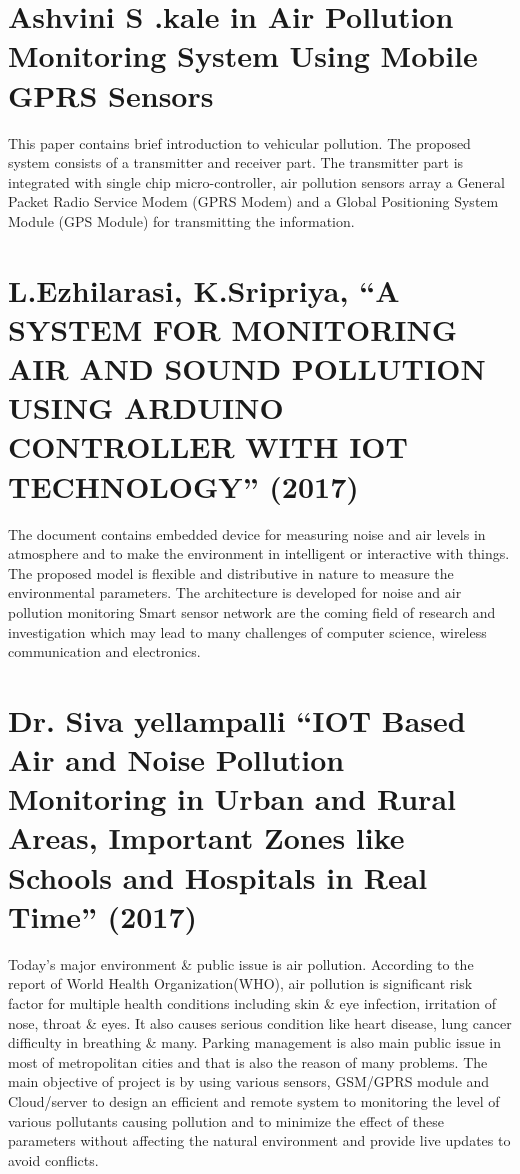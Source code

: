 \section{Ashvini S .kale in Air Pollution Monitoring System Using Mobile GPRS Sensors}
This paper contains brief introduction to vehicular pollution. The proposed system consists of a transmitter and receiver part. The transmitter part is integrated with single chip micro-controller, air pollution sensors array a General Packet Radio Service Modem (GPRS Modem) and a Global Positioning System Module (GPS Module) for transmitting the information.

\section{L.Ezhilarasi, K.Sripriya, “A SYSTEM FOR MONITORING AIR AND SOUND
POLLUTION USING ARDUINO CONTROLLER WITH IOT TECHNOLOGY”
(2017)}

The document contains embedded device for measuring noise and air levels in atmosphere and to make the environment in intelligent or interactive with things. The proposed model is flexible and distributive in nature to measure the environmental parameters. The architecture is developed for noise and air pollution monitoring Smart sensor network are the coming field of research and investigation which may lead to many challenges of computer science, wireless communication and electronics.

\section{Dr. Siva yellampalli “IOT Based Air and Noise Pollution Monitoring in Urban
and Rural Areas, Important Zones like Schools and Hospitals in Real Time” (2017)}

Today's major environment \& public issue is air pollution. According to the report of World Health Organization(WHO), air pollution is significant risk factor for multiple health conditions including skin \& eye infection, irritation of nose, throat \& eyes. It also causes serious condition like heart disease, lung cancer difficulty in breathing \& many. Parking management is also main public issue in most of metropolitan cities and that is also the reason of many problems. The main objective of project is by using various sensors, GSM/GPRS module and Cloud/server to design an efficient and remote system to monitoring the level of various pollutants causing pollution and to minimize the effect of these parameters without affecting the natural environment and provide live updates to avoid conflicts.  
